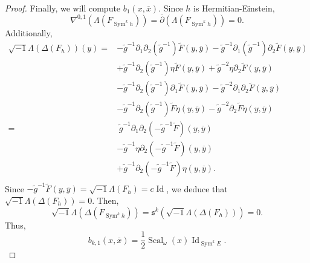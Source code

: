 \documentclass[10pt,a4paper]{amsart}
\DeclareMathOperator{\Id}{Id}
\DeclareMathOperator{\Scal}{Scal}
\DeclareMathOperator{\Sym}{Sym}
\begin{document}
\begin{proof}
Finally, we will compute $b_1(x,\overline{x})$. Since $h$ is Hermitian-Einstein, 
\begin{equation*}
\nabla^{0,1} (\Lambda (F_{\Sym^k h})) = \overline{\partial} (\Lambda (F_{\Sym^k h})) = 0.    
\end{equation*}
Additionally,
\begin{equation*}
\begin{split}
\sqrt{-1} \Lambda (\Delta (F_{ h}))(y) =  & - \tilde{g}^{-1}\partial_1\partial_2(\tilde{g}^{-1}) \tilde{F}(y,\overline{y}) - \tilde{g}^{-1} \partial_1(\tilde{g}^{-1}) \partial_2\tilde{F}(y,\overline{y}) \\
    & + \tilde{g}^{-1} \partial_2(\tilde{g}^{-1}) \eta \tilde{F} (y,\overline{y}) + \tilde{g}^{-2} \eta \partial_2 \tilde{F}(y,\overline{y}) \\
    & -\tilde{g}^{-1} \partial_2(\tilde{g}^{-1}) \partial_1\tilde{F}(y,\overline{y}) - \tilde{g}^{-2} \partial_1\partial_2\tilde{F}(y,\overline{y}) \\
    & - \tilde{g}^{-1} \partial_2(\tilde{g}^{-1}) \tilde{F} \eta(y,\overline{y}) - \tilde{g}^{-2} \partial_2\tilde{F}\eta(y,\overline{y}) \\
    = & \hspace{3pt} \tilde{g}^{-1} \partial_1\partial_2(-\tilde{g}^{-1} \tilde{F}) (y,\overline{y}) \\
    & - \tilde{g}^{-1} \eta \partial_2(-\tilde{g}^{-1} \tilde{F}) (y,\overline{y})\\
    & +  \tilde{g}^{-1} \partial_2(-\tilde{g}^{-1} \tilde{F}) \eta (y,\overline{y}). \\
\end{split}
\end{equation*}
Since $-\tilde{g}^{-1} \tilde{F}(y,\overline{y}) = \sqrt{-1}\Lambda (F_{ h}) = c \Id$, we deduce that $\sqrt{-1} \Lambda(\Delta(F_{h})) = 0$. Then, 
\begin{equation*}
    \sqrt{-1} \Lambda(\Delta(F_{\Sym^k h})) =  \mathfrak{s}^k (\sqrt{-1} \Lambda(\Delta(F_{h}))) = 0.
\end{equation*}
Thus,
\begin{equation*}
 b_{k,1}(x,\overline{x}) = \frac{1}{2} \Scal_\omega(x) \Id_{\Sym^k E}.
\end{equation*}

\end{proof}
\end{document}
